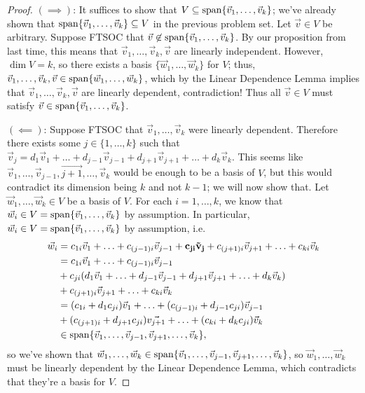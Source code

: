 \documentclass[main.tex]{subfiles}
\begin{document}
\begin{proof}
    $(\implies)$: It suffices to show that $V\subseteq \operatorname{span}\{\vec{v}_1, \ldots , \vec{v}_k\}$; we've already shown that $\operatorname{span}\{\vec{v}_1, \ldots , \vec{v}_k\}\subseteq V$ in the previous problem set. Let $\vec{v} \in V$ be arbitrary. Suppose FTSOC that $\vec{v}\not\in \operatorname{span}\{\vec{v}_1, \ldots , \vec{v}_k\}$. By our proposition from last time, this means that $\vec{v}_1, \ldots , \vec{v}_k , \vec{v}$ are linearly independent. However, $\dim V = k$, so there exists a basis $\{\vec{w}_1, \ldots , \vec{w}_k\}$ for $V$; thus, $\vec{v}_1, \ldots , \vec{v}_k, \vec{v}\in \operatorname{span} \{\vec{w}_1, \ldots , \vec{w}_k\}$,  which by the Linear Dependence Lemma implies that $\vec{v}_1, \ldots , \vec{v}_k, \vec{v}$ are linearly dependent, contradiction! Thus all $\vec{v}\in V$ must satisfy $\vec{v}\in \operatorname{span}\{\vec{v}_1, \ldots , \vec{v}_k\}$.

    $(\impliedby)$: Suppose FTSOC that $\vec{v}_1, \ldots , \vec{v}_k$ were linearly dependent. Therefore there exists some $j\in \{1, \ldots , k\}$ such that $\vec{v}_j = d_1\vec{v}_1 + \ldots + d_{j - 1}\vec{v}_{j - 1} + d_{j + 1}\vec{v}_{j + 1} + \ldots + d_k\vec{v}_k$. This seems like $\vec{v}_1, \ldots , \vec{v}_{j - 1}, \vec{j + 1}, \ldots , \vec{v}_k$ would be enough to be a basis of $V$, but this would contradict its dimension being $k$ and not $k - 1$; we will now show that. Let $\vec{w}_1, \ldots , \vec{w}_k\in V$ be a basis of $V$. For each $i = 1, \ldots , k$, we know that $\vec{w}_i \in V = \operatorname{span}\{\vec{v}_1, \ldots , \vec{v}_k\}$ by assumption. In particular, $\vec{w}_i \in V = \operatorname{span}\{\vec{v}_1, \ldots , \vec{v}_k\}$ by assumption, i.e.
    \begin{align*}
        \vec{w}_i &= c_{1i}\vec{v}_1 + \ldots + c_{(j - 1)i}\vec{v}_{j - 1} + \mathbf{c_{ji}\vec{v}_j} + c_{(j + 1)i}\vec{v}_{j + 1} + \ldots + c_{ki}\vec{v}_k \\
        &= c_{1i}\vec{v}_1 + \ldots + c_{(j - 1)i}\vec{v}_{j - 1} \\
        &+ c_{ji}(d_1\vec{v}_1 + \ldots + d_{j - 1}\vec{v}_{j - 1} + d_{j + 1}\vec{v}_{j + 1} + \ldots + d_k\vec{v}_k) \\
        &+ c_{(j + 1)i}\vec{v}_{j + 1} + \ldots + c_{ki}\vec{v}_k \\
        &= (c_{1i} + d_1c_{ji})\vec{v}_1 + \ldots + (c_{(j - 1)i} + d_{j - 1}c_{ji})\vec{v}_{j - 1} \\
        &+ (c_{(j + 1)i} + d_{j + 1}c_{ji})\vec{v_{j + 1}} + \ldots + (c_{ki} + d_kc_{ji})\vec{v}_k \\
        &\in \operatorname{span}\{\vec{v}_1, \ldots , \vec{v}_{j - 1}, \vec{v}_{j + 1}, \ldots , \vec{v}_k\},
    \end{align*}
    so we've shown that $\vec{w}_1, \ldots , \vec{w}_k\in \operatorname{span}\{\vec{v}_1, \ldots , \vec{v}_{j - 1}, \vec{v}_{j + 1}, \ldots , \vec{v}_k\}$, so $\vec{w}_1, \ldots , \vec{w}_k$ must be linearly dependent by the Linear Dependence Lemma, which contradicts that they're a basis for $V$.
\end{proof}
\end{document}
